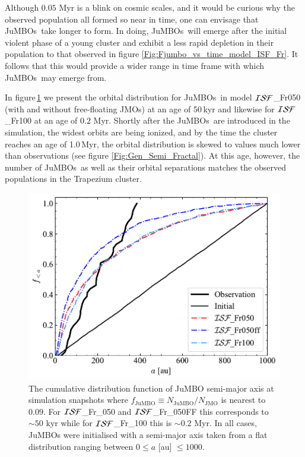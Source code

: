 \documentclass[submission,phys]{lib/SciPost}
\newcommand{\jumbos}{\mbox{JuMBOs}}
\begin{document}
Although $0.05$ Myr is a blink on cosmic 
scales, and it would be curious why the observed population all formed so near 
in time, one can envisage that \jumbos\ take longer to form. In doing, \jumbos\ 
will emerge after the initial violent phase of a young cluster and exhibit a  
less rapid depletion in their population to that observed in figure  
\ref{Fig:Fjumbo_vs_time_model_ISF_Fr}. It follows that this would provide a  
wider range in time frame with which \jumbos\ may emerge from.

In figure\,\ref{Fig:sma_vs_time_model_ISF_FrA} we present the orbital
distribution for \jumbos\, in model ${\cal ISF}$\_Fr050 (with and
without free-floating JMOs) at an age of 50\,kyr and likewise for ${\cal ISF}$\_Fr100 at an age of $0.2$ Myr. Shortly after the
\jumbos\, are introduced in the simulation, the widest orbits are
being ionized, and by the time the cluster reaches an age of 1.0\,Myr,
the orbital distribution is skewed to values much lower than observations (see figure \ref{Fig:Gen_Semi_Fractal}). At this age, however, the number of \jumbos\, as
well as their orbital separations matches the observed populations in
the Trapezium cluster. 

\begin{figure}
    \centering
    \includegraphics[width=\columnwidth]{figures/Fractal_General_sem_axis_crop.pdf}
    \caption{ The cumulative distribution function of JuMBO semi-major
      axis at simulation snapshots where
      $f_{\mathrm{JuMBO}}\equiv{N_{\mathrm{JuMBO}}}/{N_{\mathrm{JMO}}}$
      is nearest to $0.09$. For ${\cal ISF}$\_Fr\_050 and ${\cal
        ISF}$\_Fr\_050FF this corresponds to $\sim 50$ kyr while for
      ${\cal ISF}$\_Fr\_100 this is $\sim0.2$ Myr. In all cases,
      JuMBOs were initialised with a semi-major axis taken from a flat
      distribution ranging between $0\leq a$ [au] $\leq 1000$.  }
        \label{Fig:sma_vs_time_model_ISF_FrA}
\end{figure}
\end{document}
